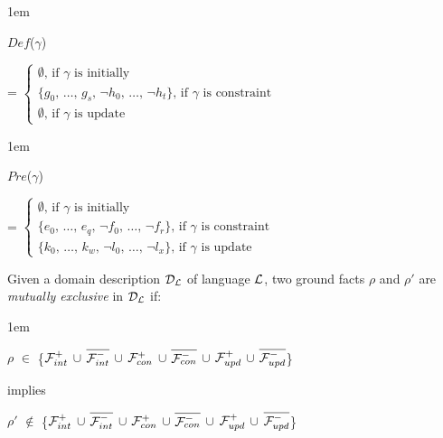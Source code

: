\documentclass[global,twocolumn,final]{svjour}
\newenvironment{vdefinition}
  {\begin{definition}\hspace{0.25em}}
  {\end{definition}}
\newenvironment{vquote}
  {\begin{list}{}{\leftmargin 1em}\item[]}
  {\end{list}}
\begin{document}
    \begin{vquote}
      $Def$($\gamma$)

      \hspace{1em}
      =
      \begin{math}
        \begin{cases}
          \mbox{$\emptyset$, if $\gamma$ is initially} \\
          \mbox{\{$g_{0}$, \ldots, $g_{s}$, $\lnot$$h_{0}$, \ldots, $\lnot$$h_{t}$\}, if $\gamma$ is constraint} \\
          \mbox{$\emptyset$, if $\gamma$ is update}
        \end{cases}
      \end{math}
    \end{vquote}

    \begin{vquote}
      $Pre$($\gamma$)

      \hspace{1em}
      =
      \begin{math}
        \begin{cases}
          \mbox{$\emptyset$, if $\gamma$ is initially} \\
          \mbox{\{$e_{0}$, \ldots, $e_{q}$, $\lnot$$f_{0}$, \ldots, $\lnot$$f_{r}$\}, if $\gamma$ is constraint} \\
          \mbox{\{$k_{0}$, \ldots, $k_{w}$, $\lnot$$l_{0}$, \ldots, $\lnot$$l_{x}$\}, if $\gamma$ is update}
        \end{cases}
      \end{math}
    \end{vquote}

    \begin{vdefinition}
      \label{def-mutex}
      Given a domain description ${\cal D_{L}}$ of language ${\cal L}$,
      two ground facts $\rho$ and $\rho'$ are {\em mutually exclusive}
      in ${\cal D_{L}}$ if:
      \begin{vquote}
        $\rho$ $\in$ \{${\cal F}^{+}_{int}$ $\cup$
        $\overline{{\cal F}^{-}_{int}}$ $\cup$ ${\cal F}^{+}_{con}$ $\cup$
        $\overline{{\cal F}^{-}_{con}}$ $\cup$ ${\cal F}^{+}_{upd}$ $\cup$
        $\overline{{\cal F}^{-}_{upd}}$\}

        implies

        $\rho'$ $\not\in$ \{${\cal F}^{+}_{int}$ $\cup$
        $\overline{{\cal F}^{-}_{int}}$ $\cup$ ${\cal F}^{+}_{con}$ $\cup$
        $\overline{{\cal F}^{-}_{con}}$ $\cup$ ${\cal F}^{+}_{upd}$ $\cup$
        $\overline{{\cal F}^{-}_{upd}}$\}
      \end{vquote}
    \end{vdefinition}
\end{document}
